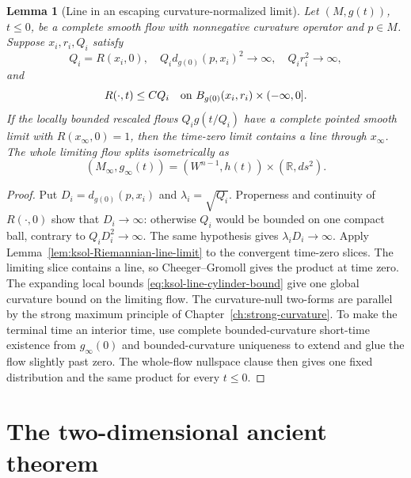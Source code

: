 \documentclass[10pt]{coll-l}
\newcommand{\R}{\mathbb{R}}
\newtheorem{lemma}[theorem]{Lemma}
\theoremstyle{definition}
\theoremstyle{remark}
\numberwithin{section}{chapter}
\numberwithin{equation}{chapter}
\begin{document}
\begin{lemma}[Line in an escaping curvature-normalized limit]
\label{lem:ksol-dimension-reduction-line}
Let $(M,g(t))$, $t\leq0$, be a complete smooth flow with nonnegative
curvature operator and $p\in M$.  Suppose $x_i,r_i,Q_i$ satisfy
\begin{equation}
 Q_i=R(x_i,0),\quad
 Q_i d_{g(0)}(p,x_i)^2\to\infty,\quad Q_ir_i^2\to\infty,       \label{eq:ksol-line-hypotheses}
\end{equation}
and
\begin{equation}
 R(\cdot,t)\leq C Q_i
 \quad\hbox{on }B_{g(0)}(x_i,r_i)\times(-\infty,0].            \label{eq:ksol-line-cylinder-bound}
\end{equation}
If the locally bounded rescaled flows $Q_i g(t/Q_i)$ have a complete
pointed smooth limit
with $R(x_\infty,0)=1$, then the time-zero limit contains a line through
$x_\infty$.  The whole limiting flow splits isometrically as
\begin{equation}
       (M_\infty,g_\infty(t))
       =(W^{n-1},h(t))\times(\R,ds^2).                         \label{eq:ksol-dimension-reduction-product}
\end{equation}
\end{lemma}

\begin{proof}
Put $D_i=d_{g(0)}(p,x_i)$ and $\lambda_i=\sqrt{Q_i}$.  Properness and
continuity of $R(\cdot,0)$ show that $D_i\to\infty$: otherwise $Q_i$ would
be bounded on one compact ball, contrary to $Q_iD_i^2\to\infty$.  The same
hypothesis gives $\lambda_iD_i\to\infty$.  Apply
Lemma~\ref{lem:ksol-Riemannian-line-limit} to the convergent time-zero
slices.  The limiting slice contains a line, so Cheeger--Gromoll gives the
product at time zero.  The expanding local bounds
\eqref{eq:ksol-line-cylinder-bound} give one global curvature bound on the
limiting flow.  The
curvature-null two-forms are parallel by the strong maximum principle of
Chapter~\ref{ch:strong-curvature}.  To make the terminal time an interior
time, use complete bounded-curvature short-time existence from
$g_\infty(0)$ and bounded-curvature uniqueness to extend and glue the flow
slightly past zero.  The whole-flow nullspace clause then gives one fixed
distribution and the same product for every $t\leq0$.
\end{proof}

\section{The two-dimensional ancient theorem}
\label{sec:ksol-surface}
\end{document}
